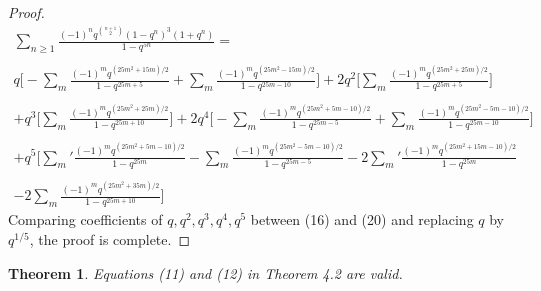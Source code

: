 \documentclass[10pt,reqno]{amsart}
\newtheorem{theorem}{Theorem}[section]
\begin{document}
\begin{proof}
\begin{multline}
    \displaystyle\sum_{n\geq 1}\displaystyle\frac{(-1)^nq^{\binom{n+1}{2}}(1-q^n)^3(1+q^n)}{1-q^{5n}}=\\ \\ q\Bigg[-\displaystyle\sum_{m}\displaystyle\frac{(-1)^mq^{(25m^2+15m)/2}}{1-q^{25m+5}}+\displaystyle\sum_{m}\displaystyle\frac{(-1)^mq^{(25m^2-15m)/2}}{1-q^{25m-10}}\Bigg]+2q^2\Bigg[\displaystyle\sum_{m}\displaystyle\frac{(-1)^mq^{(25m^2+25m)/2}}{1-q^{25m+5}}\Bigg]\\ \\ +q^3\Bigg[\displaystyle\sum_{m}\displaystyle\frac{(-1)^mq^{(25m^2+25m)/2}}{1-q^{25m+10}}\Bigg]+2q^4\Bigg[-\displaystyle\sum_{m}\displaystyle\frac{(-1)^mq^{(25m^2+5m-10)/2}}{1-q^{25m-5}}+\displaystyle\sum_{m}\displaystyle\frac{(-1)^mq^{(25m^2-5m-10)/2}}{1-q^{25m-10}}\Bigg]\\ \\ +q^5\Bigg[\displaystyle\sum_{m}'\displaystyle\frac{(-1)^mq^{(25m^2+5m-10)/2}}{1-q^{25m}}-\displaystyle\sum_{m}\displaystyle\frac{(-1)^mq^{(25m^2-5m-10)/2}}{1-q^{25m-5}}-2\displaystyle\sum_{m}'\displaystyle\frac{(-1)^mq^{(25m^2+15m-10)/2}}{1-q^{25m}}\\ \\ -2\displaystyle\sum_{m}\displaystyle\frac{(-1)^mq^{(25m^2+35m)/2}}{1-q^{25m+10}}\Bigg]
\end{multline}
Comparing coefficients of $q,q^2,q^3,q^4,q^5$ between (16) and (20) and replacing $q$ by $q^{1/5}$, the proof is complete.
\end{proof}
\begin{theorem}
Equations (11) and (12) in Theorem 4.2 are valid.
\end{theorem}
\end{document}
